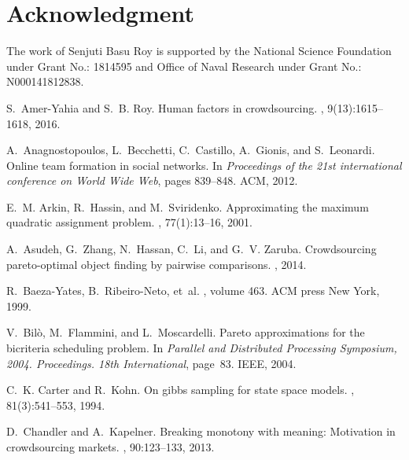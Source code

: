 \documentclass[11pt]{article}
\begin{document}
\section{Acknowledgment}
\vspace{-0.1in}
The work of Senjuti Basu Roy is supported by the National Science
Foundation under Grant No.: 1814595 and Office of Naval Research
under Grant No.: N000141812838. 



\vspace{-0.2in}

%
%
\begin{thebibliography}{10}
	
	S.~Amer-Yahia and S.~B. Roy.
	\newblock Human factors in crowdsourcing.
	, 9(13):1615--1618, 2016.
	
	A.~Anagnostopoulos, L.~Becchetti, C.~Castillo, A.~Gionis, and S.~Leonardi.
	\newblock Online team formation in social networks.
	\newblock In {\em Proceedings of the 21st international conference on World
		Wide Web}, pages 839--848. ACM, 2012.
	
	E.~M. Arkin, R.~Hassin, and M.~Sviridenko.
	\newblock Approximating the maximum quadratic assignment problem.
	, 77(1):13--16, 2001.
	
	A.~Asudeh, G.~Zhang, N.~Hassan, C.~Li, and G.~V. Zaruba.
	\newblock Crowdsourcing pareto-optimal object finding by pairwise comparisons.
	, 2014.
	
	R.~Baeza-Yates, B.~Ribeiro-Neto, et~al.
	, volume 463.
	\newblock ACM press New York, 1999.
	
	V.~Bil{\`o}, M.~Flammini, and L.~Moscardelli.
	\newblock Pareto approximations for the bicriteria scheduling problem.
	\newblock In {\em Parallel and Distributed Processing Symposium, 2004.
		Proceedings. 18th International}, page~83. IEEE, 2004.
	
	C.~K. Carter and R.~Kohn.
	\newblock On gibbs sampling for state space models.
	, 81(3):541--553, 1994.
	
	D.~Chandler and A.~Kapelner.
	\newblock Breaking monotony with meaning: Motivation in crowdsourcing markets.
	, 90:123--133,
	2013.
	

\end{thebibliography}
\end{document}
